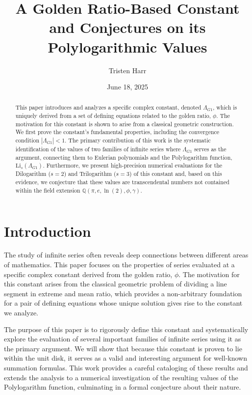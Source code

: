 \documentclass{amsart}
\theoremstyle{plain}
\theoremstyle{definition}
\theoremstyle{remark}
\newcommand{\LambdaG}{\Lambda_{G1}}
\begin{document}
\title[A Golden Ratio Constant and its Polylogarithmic Values]{A Golden Ratio-Based Constant and Conjectures on its Polylogarithmic Values}
\author{Tristen Harr}
\date{June 18, 2025}

\begin{abstract}
This paper introduces and analyzes a specific complex constant, denoted $\LambdaG$, which is uniquely derived from a set of defining equations related to the golden ratio, $\phi$. The motivation for this constant is shown to arise from a classical geometric construction. We first prove the constant's fundamental properties, including the convergence condition $|\LambdaG| < 1$. The primary contribution of this work is the systematic identification of the values of two families of infinite series where $\LambdaG$ serves as the argument, connecting them to Eulerian polynomials and the Polylogarithm function, $\mathrm{Li}_s(\LambdaG)$. Furthermore, we present high-precision numerical evaluations for the Dilogarithm ($s=2$) and Trilogarithm ($s=3$) of this constant and, based on this evidence, we conjecture that these values are transcendental numbers not contained within the field extension $\mathbb{Q}(\pi, e, \ln(2), \phi, \gamma)$.
\end{abstract}

\maketitle

\section{Introduction}
The study of infinite series often reveals deep connections between different areas of mathematics. This paper focuses on the properties of series evaluated at a specific complex constant derived from the golden ratio, $\phi$. The motivation for this constant arises from the classical geometric problem of dividing a line segment in extreme and mean ratio, which provides a non-arbitrary foundation for a pair of defining equations whose unique solution gives rise to the constant we analyze.

The purpose of this paper is to rigorously define this constant and systematically explore the evaluation of several important families of infinite series using it as the primary argument. We will show that because this constant is proven to lie within the unit disk, it serves as a valid and interesting argument for well-known summation formulas. This work provides a careful cataloging of these results and extends the analysis to a numerical investigation of the resulting values of the Polylogarithm function, culminating in a formal conjecture about their nature.
\end{document}
